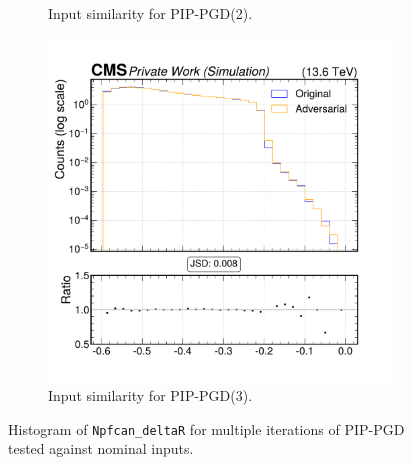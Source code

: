 \begin{figure}[htbp]
\begin{subfigure}[t]{0.32\textwidth}
    \caption*{Input similarity for PIP-PGD(2).}
  \end{subfigure}\hfill
  \begin{subfigure}[t]{0.32\textwidth}
    \includegraphics[width=\linewidth]{media/output/features/compare/combined_it_3/cmp_npf_arr_Npfcan_deltaR.pdf}
    \caption*{Input similarity for PIP-PGD(3).}
  \end{subfigure}

  \caption*{Histogram of \texttt{Npfcan\_deltaR} for multiple iterations of PIP-PGD tested against nominal inputs.}
  \label{fig:combined_input_Npfcan_deltaR}
\end{figure}

